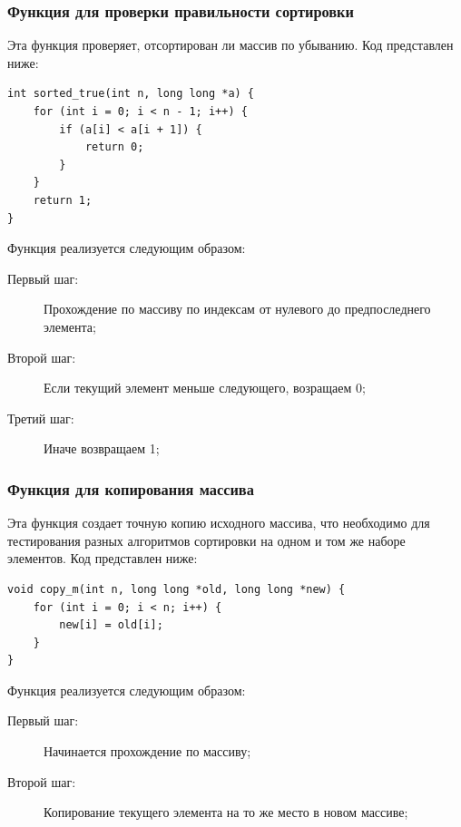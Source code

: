 \documentclass[a4paper,12pt,titlepage,finall]{article}
\begin{document}
\subsubsection{Функция для проверки правильности сортировки}
Эта функция проверяет, отсортирован ли массив по убыванию.
Код представлен ниже:

\begin{verbatim}
int sorted_true(int n, long long *a) {
    for (int i = 0; i < n - 1; i++) {
        if (a[i] < a[i + 1]) {
            return 0;
        }
    }
    return 1;
}
\end{verbatim}

Функция реализуется следующим образом:

\begin{description}
\item[Первый шаг:] Прохождение по массиву по индексам от нулевого до предпоследнего элемента;

\item[Второй шаг:] Если текущий элемент меньше следующего, возращаем 0;

\item[Третий шаг:] Иначе возвращаем 1;

\end{description}


\subsubsection{Функция для копирования массива}
Эта функция создает точную копию исходного массива, что необходимо для тестирования разных алгоритмов сортировки на одном и том же наборе элементов.
Код представлен ниже:

\begin{verbatim}
void copy_m(int n, long long *old, long long *new) {
    for (int i = 0; i < n; i++) {
        new[i] = old[i];
    }
}
\end{verbatim}

Функция реализуется следующим образом:

\begin{description}
\item[Первый шаг:] Начинается прохождение по массиву;

\item[Второй шаг:] Копирование текущего элемента на то же место в новом массиве;

\end{description}
\end{document}
